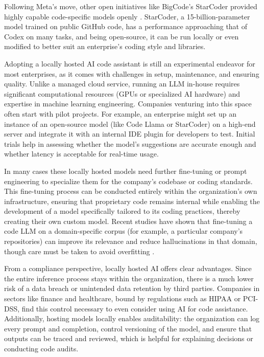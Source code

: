 Following Meta’s move, other open initiatives like BigCode’s StarCoder provided highly capable code-specific models openly \autocite{Li2023StarCoder}. StarCoder, a 15-billion-parameter model trained on public GitHub code, has a performance approaching that of Codex on many tasks, and being open-source, it can be run locally or even modified to better suit an enterprise’s coding style and libraries.

Adopting a locally hosted \gls{AI} code assistant is still an experimental endeavor for most enterprises, as it comes with challenges in setup, maintenance, and ensuring quality. Unlike a managed cloud service, running an \gls{LLM} in-house requires significant computational resources (GPUs or specialized \gls{AI} hardware) and expertise in machine learning engineering. Companies venturing into this space often start with pilot projects. For example, an enterprise might set up an instance of an open-source model (like Code Llama or StarCoder) on a high-end server and integrate it with an internal \gls{IDE} plugin for developers to test. Initial trials help in assessing whether the model’s suggestions are accurate enough and whether latency is acceptable for real-time usage.

In many cases these locally hosted models need further fine-tuning or prompt engineering to specialize them for the company’s codebase or coding standards. This fine-tuning process can be conducted entirely within the organization’s own infrastructure, ensuring that proprietary code remains internal while enabling the development of a model specifically tailored to its coding practices, thereby creating their own custom model. Recent studies have shown that fine-tuning a code \gls{LLM} on a domain-specific corpus (for example, a particular company’s repositories) can improve its relevance and reduce hallucinations in that domain, though care must be taken to avoid overfitting \autocite{Roziere2023}.

From a compliance perspective, locally hosted \gls{AI} offers clear advantages. Since the entire inference process stays within the organization, there is a much lower risk of a data breach or unintended data retention by third parties. Companies in sectors like finance and healthcare, bound by regulations such as HIPAA or PCI-DSS, find this control necessary to even consider using \gls{AI} for code assistance. Additionally, hosting models locally enables auditability: the organization can log every prompt and completion, control versioning of the model, and ensure that outputs can be traced and reviewed, which is helpful for explaining decisions or conducting code audits.

